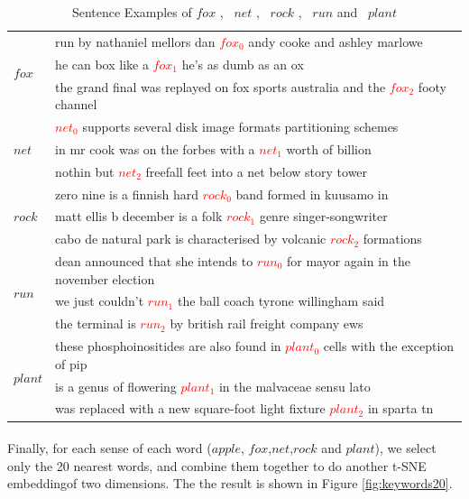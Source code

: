 \begin{table}[tb]
\caption{Sentence Examples of $fox$ , \ $net$ , \ $rock$ , \ $run$ and \ $plant$ } \label{tab:sentenceother} 
\begin{center} 
\begin{tabular}{|l|l|}
\hline
\multirow{3}{*}{$fox$} 
&run by nathaniel mellors dan \textcolor{red}{$fox_0$} andy cooke and ashley marlowe\\
&he can box like a \textcolor{red}{$fox_1$} he's as dumb as an ox\\
&the grand final was replayed on fox sports australia and the \textcolor{red}{$fox_2$} footy channel\\
\hline
\multirow{3}{*}{$net$} 
&\textcolor{red}{$net_0$} supports several disk image formats partitioning schemes\\
&in mr cook was on the forbes with a \textcolor{red}{$net_1$} worth of billion \\
&nothin but \textcolor{red}{$net_2$} freefall feet into a net below story tower\\
\hline
\multirow{3}{*}{$rock$} 
&zero nine is a finnish hard \textcolor{red}{$rock_0$} band formed in kuusamo in\\
&matt ellis b december is a folk \textcolor{red}{$rock_1$} genre singer-songwriter\\
&cabo de natural park is characterised by volcanic \textcolor{red}{$rock_2$} formations\\
\hline
\multirow{3}{*}{$run$} 
&dean announced that she intends to \textcolor{red}{$run_0$} for mayor again in the november election\\
& we just couldn't \textcolor{red}{$run_1$} the ball coach tyrone willingham said\\
& the terminal is \textcolor{red}{$run_2$} by british rail freight company ews\\
\hline
\multirow{3}{*}{$plant$} 
&these phosphoinositides are also found in \textcolor{red}{$plant_0$} cells with the exception of pip\\
&is a genus of flowering \textcolor{red}{$plant_1$} in the malvaceae sensu lato\\
&was replaced with a new square-foot light fixture \textcolor{red}{$plant_2$} in sparta tn\\
\hline
\end{tabular} 
\end{center}
\end{table}


\paragraph{} Finally, for each sense of each word ($apple$, $fox$,$net$,$rock$ and $plant$), we select only the 20 nearest words, and combine them together to do another t-SNE embeddingof  two dimensions. The the result is shown in Figure \ref{fig:keywords20}. 

